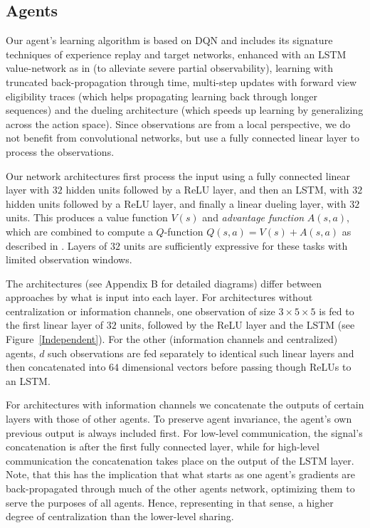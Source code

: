 \documentclass{article}
\begin{document}
\begin{SCfigure}
\subsection{Agents}
Our agent's learning algorithm is based on DQN \citep{dqn15} and includes its signature techniques of experience replay and target networks, enhanced with an LSTM value-network as in \citet{HausknechtStoneRecurrent} (to alleviate severe partial observability), learning with truncated back-propagation through time, multi-step updates with forward view eligibility traces \citep{HarbPrecupRecurrance} (which helps propagating learning back through longer sequences) and the dueling architecture \citep{WangDuelling} (which speeds up learning by generalizing across the action space). Since observations are from a local perspective, we do not benefit from convolutional networks, but use a fully connected linear layer to process the observations. 

Our network architectures first process the input using a fully connected linear layer with $32$ hidden units followed by a ReLU layer, and then an LSTM, with $32$ hidden units followed by a ReLU layer, and finally a linear dueling layer, with $32$ units. This produces a value function $V(s)$ and \emph{advantage function} $A(s,a)$, which are combined to compute a $Q$-function $Q(s,a) = V(s) + A(s,a)$ as described in \citet{WangDuelling}. Layers of $32$ units are sufficiently expressive for these tasks with limited observation windows.

The architectures (see Appendix B for detailed diagrams) differ between approaches by what is input into each layer. For architectures without centralization or information channels, one observation of size $3\times 5\times 5$ is fed to the first linear layer of $32$ units, followed by the ReLU layer and the LSTM (see Figure~\ref{Independent}). For the other (information channels and centralized) agents, $d$ such observations are fed separately to identical such linear layers and then concatenated into $64$ dimensional vectors before passing though ReLUs to an LSTM. 


For architectures with information channels we concatenate the outputs of certain layers with those of other agents. To preserve agent invariance, the agent's own previous output is always included first. For low-level communication, the signal's concatenation is after the first fully connected layer, while for high-level communication the concatenation takes place on the output of the LSTM layer. Note, that this has the implication that what starts as one agent's gradients are back-propagated through much of the other agents network, optimizing them to serve the purposes of all agents. Hence, representing in that sense, a higher degree of centralization than the lower-level sharing.





\end{SCfigure}
\end{document}
